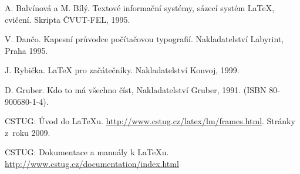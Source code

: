 \documentclass[report,11pt]{elsarticle}
\begin{document}
%
%
%

\label{SEC:References}
\renewcommand\bibname{References}
\begin{thebibliography}{10}

A. Balvínová a M. Bílý.
\newblock Textové informační systémy, sázecí systém \LaTeX, cvičení.
Skripta ČVUT-FEL, 1995.

V. Dančo.
\newblock Kapesní průvodce počítačovou typografií. Nakladatelství
Labyrint, Praha 1995.

J. Rybička.
\newblock \LaTeX\/ pro začátečníky. Nakladatelství Konvoj, 1999.

D. Gruber.
\newblock Kdo to má všechno číst, Nakladatelství Gruber, 1991.
(ISBN 80-900680-1-4).

 CSTUG: Úvod do \LaTeX{u}.
\newblock
\url{http://www.cstug.cz/latex/lm/frames.html}. Stránky z~roku 2009.

CSTUG: Dokumentace a manuály k \LaTeX{u}.
\newblock \url{http://www.cstug.cz/documentation/index.html}

\end{thebibliography}
\end{document}
